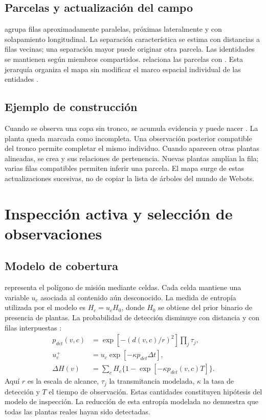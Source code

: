 \subsection{Parcelas y actualización del campo}
 agrupa filas aproximadamente paralelas, próximas lateralmente y con solapamiento longitudinal. La separación característica se estima con distancias a filas vecinas; una separación mayor puede originar otra parcela. Las identidades se mantienen según miembros compartidos.  relaciona las parcelas con . Esta jerarquía organiza el mapa sin modificar el marco espacial individual de las entidades \cite{groups,conceptos}.

\subsection{Ejemplo de construcción}
Cuando se observa una copa sin tronco, se acumula evidencia y puede nacer . La planta queda marcada como incompleta. Una observación posterior compatible del tronco permite completar el mismo individuo. Cuando aparecen otras plantas alineadas, se crea  y sus relaciones de pertenencia. Nuevas plantas amplían la fila; varias filas compatibles permiten inferir una parcela. El mapa surge de estas actualizaciones sucesivas, no de copiar la lista de árboles del mundo de Webots.

\section{Inspección activa y selección de observaciones}
\subsection{Modelo de cobertura}
 representa el polígono de misión mediante celdas. Cada celda mantiene una variable $u_c$ asociada al contenido aún desconocido. La medida de entropía utilizada por el modelo es $H_c=u_cH_0$, donde $H_0$ se obtiene del prior binario de presencia de plantas. La probabilidad de detección disminuye con distancia y con filas interpuestas \cite{explore}:
\begin{align}
p_{det}(v,c)&=\exp[-(d(v,c)/r)^2]\prod_j\tau_j,\\
u_c^+&=u_c\exp[-\kappa p_{det}\Delta t],\\
\Delta H(v)&=\sum_cH_c\{1-\exp[-\kappa p_{det}(v,c)T]\}.
\end{align}
Aquí $r$ es la escala de alcance, $\tau_j$ la transmitancia modelada, $\kappa$ la tasa de detección y $T$ el tiempo de observación. Estas cantidades constituyen hipótesis del modelo de inspección. La reducción de esta entropía modelada no demuestra que todas las plantas reales hayan sido detectadas.

